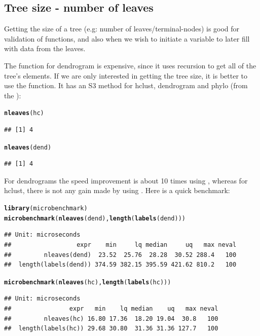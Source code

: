 \documentclass[shortnames,nojss,article]{jss}\usepackage{graphicx, color}
\makeatletter
\newcommand{\hlfunctioncall}[1]{\textcolor[rgb]{0.501960784313725,0,0.329411764705882}{\textbf{#1}}}%
\newenvironment{kframe}{%
 \def\at@end@of@kframe{}%
 \ifinner\ifhmode%
  \def\at@end@of@kframe{\end{minipage}}%
  \begin{minipage}{\columnwidth}%
 \fi\fi%
 \def\FrameCommand##1{\hskip\@totalleftmargin \hskip-\fboxsep
 \colorbox{shadecolor}{##1}\hskip-\fboxsep
     \hskip-\linewidth \hskip-\@totalleftmargin \hskip\columnwidth}%
 \MakeFramed {\advance\hsize-\width
   \@totalleftmargin\z@ \linewidth\hsize
   \@setminipage}}%
 {\par\unskip\endMakeFramed%
 \at@end@of@kframe}
\newenvironment{knitrout}{}{} %
\makeatother
\begin{document}
\subsection{Tree size - number of leaves}

Getting the size of a tree (e.g: number of leaves/terminal-nodes) is good for validation of functions, and also when we wish to initiate a variable to later fill with data from the leaves. 

The  function for dendrogram is expensive, since it uses recursion to get all of the tree's elements. If we are only interested in getting the tree size, it is better to use the  function. It has an S3 method for hclust, dendrogram and phylo (from the ):

\begin{knitrout}
\color{fgcolor}\begin{kframe}
\begin{alltt}
\hlfunctioncall{nleaves}(hc)
\end{alltt}
\begin{verbatim}
## [1] 4
\end{verbatim}
\begin{alltt}
\hlfunctioncall{nleaves}(dend)
\end{alltt}
\begin{verbatim}
## [1] 4
\end{verbatim}
\end{kframe}
\end{knitrout}


For dendrograms the speed improvement is about 10 times using , whereas for hclust, there is not any gain made by using . Here is a quick benchmark:

\begin{knitrout}
\color{fgcolor}\begin{kframe}
\begin{alltt}
\hlfunctioncall{library}(microbenchmark)
\hlfunctioncall{microbenchmark}(\hlfunctioncall{nleaves}(dend), \hlfunctioncall{length}(\hlfunctioncall{labels}(dend)))
\end{alltt}
\begin{verbatim}
## Unit: microseconds
##                  expr    min     lq median     uq   max neval
##         nleaves(dend)  23.52  25.76  28.28  30.52 288.4   100
##  length(labels(dend)) 374.59 382.15 395.59 421.62 810.2   100
\end{verbatim}
\begin{alltt}
\hlfunctioncall{microbenchmark}(\hlfunctioncall{nleaves}(hc), \hlfunctioncall{length}(\hlfunctioncall{labels}(hc)))
\end{alltt}
\begin{verbatim}
## Unit: microseconds
##                expr   min    lq median    uq   max neval
##         nleaves(hc) 16.80 17.36  18.20 19.04  30.8   100
##  length(labels(hc)) 29.68 30.80  31.36 31.36 127.7   100
\end{verbatim}
\end{kframe}
\end{knitrout}
\end{document}
